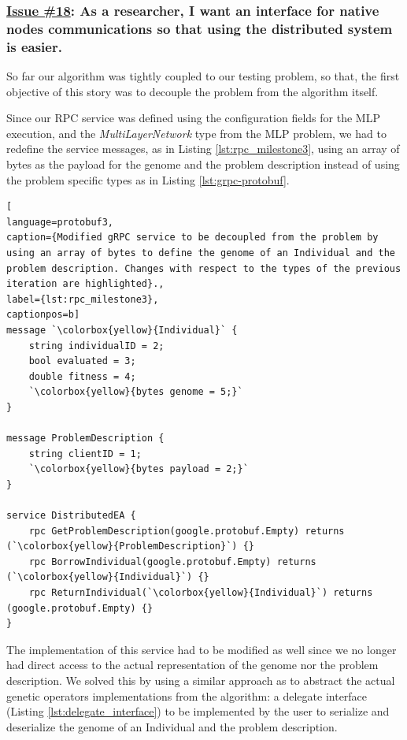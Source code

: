 \subsubsection*{\href{https://github.com/salvacorts/TFG-Parasitic-Metaheuristics/issues/18}{Issue \#18}: As a researcher, I want an interface for native nodes communications so that using the distributed system is easier.}
So far our algorithm was tightly coupled to our testing problem, so that, the first objective of this story was to decouple the problem from the algorithm itself.

Since our RPC service was defined using the configuration fields for the MLP execution, and the \textit{MultiLayerNetwork} type from the MLP problem, we had to redefine the service messages, as in Listing \ref{lst:rpc_milestone3}, using an array of bytes as the payload for the genome and the problem description instead of using the problem specific types as in Listing \ref{lst:grpc-protobuf}.

\begin{lstlisting}[
language=protobuf3,
caption={Modified gRPC service to be decoupled from the problem by using an array of bytes to define the genome of an Individual and the problem description. Changes with respect to the types of the previous iteration are highlighted}.,
label={lst:rpc_milestone3},
captionpos=b]
message `\colorbox{yellow}{Individual}` {
    string individualID = 2;
    bool evaluated = 3;
    double fitness = 4;
    `\colorbox{yellow}{bytes genome = 5;}`
}

message ProblemDescription {
    string clientID = 1;
    `\colorbox{yellow}{bytes payload = 2;}`
}

service DistributedEA {
    rpc GetProblemDescription(google.protobuf.Empty) returns (`\colorbox{yellow}{ProblemDescription}`) {}
    rpc BorrowIndividual(google.protobuf.Empty) returns (`\colorbox{yellow}{Individual}`) {}
    rpc ReturnIndividual(`\colorbox{yellow}{Individual}`) returns (google.protobuf.Empty) {}
}
\end{lstlisting}

The implementation of this service had to be modified as well since we no longer had direct access to the actual representation of the genome nor the problem description. We solved this by using a similar approach as to abstract the actual genetic operators implementations from the algorithm: a delegate interface (Listing \ref{lst:delegate_interface}) to be implemented by the user to serialize and deserialize the genome of an Individual and the problem description.


